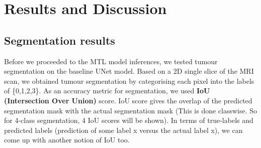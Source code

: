 


\chapter{Results and Discussion}
\ifpdf
    \graphicspath{{Results/Chapter5Figs/PNG/}{Results/Chapter5Figs/PDF/}{Results/Chapter5Figs/}}
\else
    \graphicspath{{Results/Chapter5Figs/EPS/}{Results/Chapter5Figs/}}
\fi








\hypersetup{ colorlinks=true,
    linkcolor=black,
    filecolor=magenta,      
    urlcolor=blue}


\section{Segmentation results}
\vspace*{3mm}
Before we proceeded to the MTL model inferences, we tested tumour segmentation on the baseline UNet model. Based on a 2D single slice of the MRI scan, we obtained tumour segmentation by categorising each pixel into the labels of \{0,1,2,3\}. As an accuracy metric for segmentation, we used \textbf{IoU (Intersection Over Union)} score. IoU score gives the overlap of the predicted segmentation mask with the actual segmentation mask (This is done classwise. So for 4-class segmentation, 4 IoU scores will be shown). In terms of true-labels and predicted labels (prediction of some label x versus the actual label x), we can come up with another notion of IoU too.

